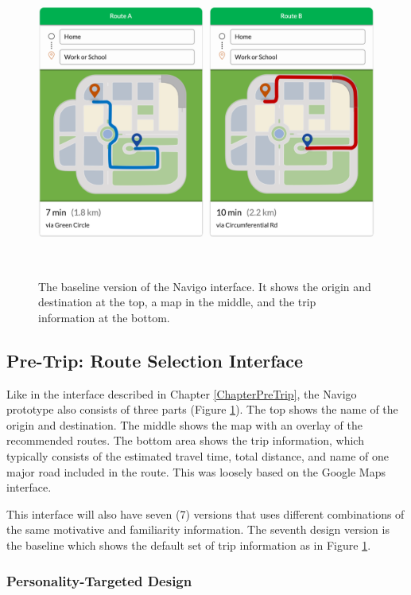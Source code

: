 \begin{figure}[h]
\centering
  \includegraphics[scale=.4]{figures/S4-H2W-BL.png}
  \caption{The baseline version of the Navigo interface. It shows the origin and destination at the top, a map in the middle, and the trip information at the bottom.}~\label{fig:s4-bl}
\end{figure}

\subsection{Pre-Trip: Route Selection Interface}
Like in the interface described in Chapter \ref{ChapterPreTrip}, the Navigo prototype also consists of three parts (Figure \ref{fig:s4-bl}). The top shows the name of the origin and destination. The middle shows the map with an overlay of the recommended routes. The bottom area shows the trip information, which typically consists of the estimated travel time, total distance, and name of one major road included in the route. This was loosely based on the Google Maps interface. 

This interface will also have seven (7) versions that uses different combinations of the same motivative and familiarity information. The seventh design version is the baseline which shows the default set of trip information as in Figure \ref{fig:s4-bl}. 

\subsubsection{Personality-Targeted Design}

